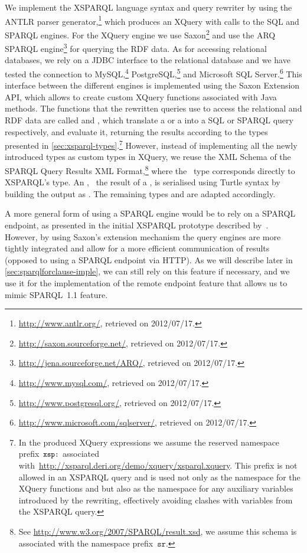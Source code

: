  
We implement the XSPARQL language syntax and query rewriter by using the ANTLR parser
generator,\footnote{\url{http://www.antlr.org/}, retrieved on 2012/07/17.}
%
which produces an XQuery with calls to the \ac{SQL} and SPARQL engines.
%
For the XQuery engine we use Saxon\footnote{\url{http://saxon.sourceforge.net/}, retrieved on 2012/07/17.} and use the
ARQ SPARQL engine\footnote{\url{http://jena.sourceforge.net/ARQ/}, retrieved on 2012/07/17.} for querying the \ac{RDF}
data.
%
As for accessing relational databases, we rely on a JDBC interface to the relational database and we have tested the
connection to MySQL,\footnote{\url{http://www.mysql.com/}, retrieved on 2012/07/17.}
PostgreSQL,\footnote{\url{http://www.postgresql.org/}, retrieved on 2012/07/17.} and Microsoft SQL
Server.\footnote{\url{http://www.microsoft.com/sqlserver/}, retrieved on 2012/07/17.}
%
This interface between the different engines is implemented using the Saxon Extension API, which allows to create custom
XQuery functions associated with Java methods.
%
The functions that the rewritten queries use to access the relational and \ac{RDF} data are called 
and , which translate a \SQLForClause or a \SparqlForClause into a \ac{SQL} or SPARQL \SELECT
query respectively, and evaluate it, returning the results according to the types presented in
\cref{sec:xsparql-types}.\footnote{In the produced XQuery expressions we assume the reserved namespace prefix~$\texttt{{\small xsp{:}}}$
  associated with~\url{http://xsparql.deri.org/demo/xquery/xsparql.xquery}. 
  This prefix is not allowed in an XSPARQL query and is used not only as the namespace for the XQuery functions
   and  but also as the namespace for any auxiliary variables introduced by the
  rewriting, effectively avoiding clashes with variables from the XSPARQL query.  }
%
However, instead of implementing all the newly introduced types as custom types in XQuery, we reuse the XML Schema of
the SPARQL Query Results XML Format,\footnote{See {\url{http://www.w3.org/2007/SPARQL/result.xsd}}, we assume this
  schema is associated with the namespace prefix~$\mathtt{sr}$.}  where the~ type corresponds
directly to XSPARQL's  type.
%
An , \eg~the result of a \ConstructClause, is serialised using Turtle syntax by building the output as
.  The remaining types  and  are adapted accordingly.


A more general form of using a SPARQL engine would be to rely on a SPARQL endpoint, as presented in the initial XSPARQL
prototype described by~\citet{AkhtarKopeckyKrennwallner:2008aa}.
%
However, by using Saxon's extension mechanism the query engines are more tightly integrated and allow for a more
efficient communication of results (opposed to using a SPARQL endpoint via HTTP).
%
As we will describe later in \cref{sec:sparqlforclause-imple}, we can still rely on this feature if necessary, and we
use it for the implementation of the remote endpoint feature that allows us to mimic SPARQL~1.1 
feature.



